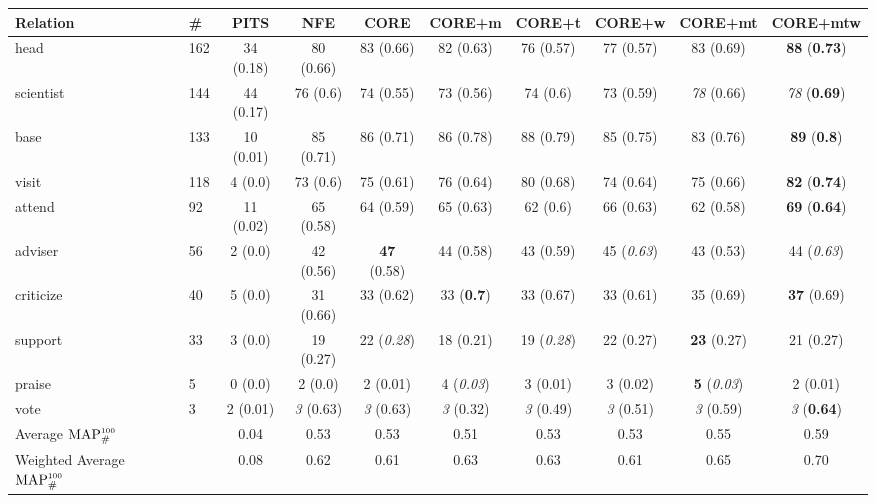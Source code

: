 
\begin{center}
\begin{tabular}{ l l | c c c c c c c c }
              Relation & \# & PITS & NFE & CORE & CORE+m & CORE+t & CORE+w & CORE+mt & CORE+mtw \\
\hline
head & 162 & 34 {\small (0.18) } & 80 {\small (0.66) } & 83 {\small (0.66) } & 82 {\small (0.63) } & 76 {\small (0.57) } & 77 {\small (0.57) } & 83 {\small (0.69) } & {\bf 88} {\small ({\bf 0.73}) }\\
scientist & 144 & 44 {\small (0.17) } & 76 {\small (0.6) } & 74 {\small (0.55) } & 73 {\small (0.56) } & 74 {\small (0.6) } & 73 {\small (0.59) } & {\em78} {\small (0.66) } & {\em78} {\small ({\bf 0.69}) }\\
base & 133 & 10 {\small (0.01) } & 85 {\small (0.71) } & 86 {\small (0.71) } & 86 {\small (0.78) } & 88 {\small (0.79) } & 85 {\small (0.75) } & 83 {\small (0.76) } & {\bf 89} {\small ({\bf 0.8}) }\\
visit & 118 & 4 {\small (0.0) } & 73 {\small (0.6) } & 75 {\small (0.61) } & 76 {\small (0.64) } & 80 {\small (0.68) } & 74 {\small (0.64) } & 75 {\small (0.66) } & {\bf 82} {\small ({\bf 0.74}) }\\
attend & 92 & 11 {\small (0.02) } & 65 {\small (0.58) } & 64 {\small (0.59) } & 65 {\small (0.63) } & 62 {\small (0.6) } & 66 {\small (0.63) } & 62 {\small (0.58) } & {\bf 69} {\small ({\bf 0.64}) }\\
adviser & 56 & 2 {\small (0.0) } & 42 {\small (0.56) } & {\bf 47} {\small (0.58) } & 44 {\small (0.58) } & 43 {\small (0.59) } & 45 {\small ({\em0.63}) } & 43 {\small (0.53) } & 44 {\small ({\em0.63}) }\\
criticize & 40 & 5 {\small (0.0) } & 31 {\small (0.66) } & 33 {\small (0.62) } & 33 {\small ({\bf 0.7}) } & 33 {\small (0.67) } & 33 {\small (0.61) } & 35 {\small (0.69) } & {\bf 37} {\small (0.69) }\\
support & 33 & 3 {\small (0.0) } & 19 {\small (0.27) } & 22 {\small ({\em0.28}) } & 18 {\small (0.21) } & 19 {\small ({\em0.28}) } & 22 {\small (0.27) } & {\bf 23} {\small (0.27) } & 21 {\small (0.27) }\\
praise & 5 & 0 {\small (0.0) } & 2 {\small (0.0) } & 2 {\small (0.01) } & 4 {\small ({\em0.03}) } & 3 {\small (0.01) } & 3 {\small (0.02) } & {\bf 5} {\small ({\em0.03}) } & 2 {\small (0.01) }\\
vote & 3 & 2 {\small (0.01) } & {\em3} {\small (0.63) } & {\em3} {\small (0.63) } & {\em3} {\small (0.32) } & {\em3} {\small (0.49) } & {\em3} {\small (0.51) } & {\em3} {\small (0.59) } & {\em3} {\small ({\bf 0.64}) }\\
\hline
  Average $\text{MAP}^{\text{\tiny{100}}}_\#$ &      &   0.04 &   0.53 &   0.53 &   0.51 &   0.53 &   0.53 &   0.55 &   0.59 \\
  Weighted Average $\text{MAP}^{\text{\tiny{100}}}_\#$ &      &   0.08 &   0.62 &   0.61 &   0.63 &   0.63 &   0.61 &   0.65 &   0.70 \\
\end{tabular}
\end{center}
